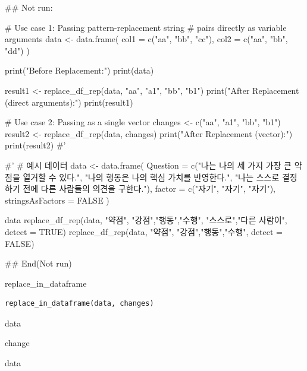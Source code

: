 \documentclass[a4paper]{book}
\begin{document}
\begin{Examples}
\begin{ExampleCode}

\#\# Not run: 

# Use case 1: Passing pattern-replacement string
# pairs directly as variable arguments
data <- data.frame(
  col1 = c("aa", "bb", "cc"),
  col2 = c("aa", "bb", "dd")
)

print("Before Replacement:")
print(data)

result1 <- replace_df_rep(data, "aa", "a1", "bb", "b1")
print("After Replacement (direct arguments):")
print(result1)

# Use case 2: Passing as a single vector
changes <- c("aa", "a1", "bb", "b1")
result2 <- replace_df_rep(data, changes)
print("After Replacement (vector):")
print(result2)
#'

#'
# 예시 데이터
data <- data.frame(
  Question = c("나는 나의 세 가지 가장 큰 약점을 열거할 수 있다.",
   "나의 행동은 나의 핵심 가치를 반영한다.",
   "나는 스스로 결정하기 전에 다른 사람들의 의견을 구한다."),
  factor = c("자기", "자기", "자기"),
  stringsAsFactors = FALSE
)

data
replace_df_rep(data, "약점", "강점","행동","수행",
"스스로","다른 사람이",  detect = TRUE)
replace_df_rep(data, "약점",
"강점","행동","수행",  detect = FALSE)



## End(Not run)



\end{ExampleCode}
\end{Examples}
%
\begin{Description}
replace\_in\_dataframe
\end{Description}
%
\begin{Usage}
\begin{verbatim}
replace_in_dataframe(data, changes)
\end{verbatim}
\end{Usage}
%
\begin{Arguments}
\begin{ldescription}
\item[\code{data}] data

\item[\code{changes}] change
\end{ldescription}
\end{Arguments}
%
\begin{Value}
data
\end{Value}
\end{document}
